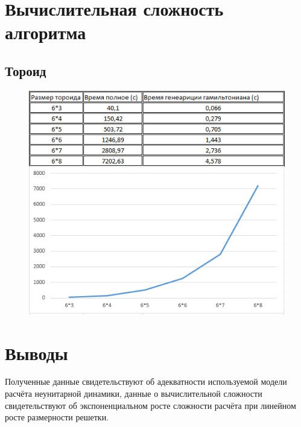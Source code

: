 \documentclass[12pt, a4paper]{article}
\begin{document}
\section{Вычислительная сложность алгоритма}
\subsection{Тороид}
\begin{figure}[htp]
	\centering
	\includegraphics[scale=0.75]{Time_compl.png}
	\caption{}
	\label{}
\end{figure}
\section{Выводы}
\quad Полученные данные свидетельствуют об адекватности используемой модели расчёта неунитарной динамики, данные о вычислительной сложности свидетельствуют об экспоненциальном росте сложности расчёта при линейном росте размерности решетки. 
\newpage 
\end{document}
